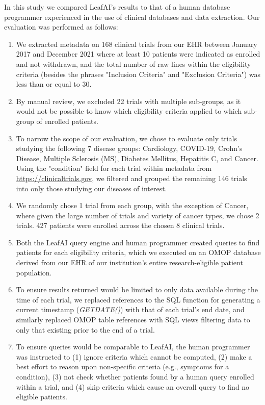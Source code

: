 \documentclass[../main.tex]{subfiles}
\begin{document}
In this study we compared LeafAI's results to that of a human database programmer experienced in the use of clinical databases and data extraction. Our evaluation was performed as follows:

\begin{enumerate}
    \item We extracted metadata on 168 clinical trials from our EHR between January 2017 and December 2021 where at least 10 patients were indicated as enrolled and not withdrawn, and the total number of raw lines within the eligibility criteria (besides the phrases "Inclusion Criteria" and "Exclusion Criteria") was less than or equal to 30.
    \item By manual review, we excluded 22 trials with multiple sub-groups, as it would not be possible to know which eligibility criteria applied to which sub-group of enrolled patients.
    \item To narrow the scope of our evaluation, we chose to evaluate only trials studying the following 7 disease groups: Cardiology, COVID-19, Crohn's Disease, Multiple Sclerosis (MS), Diabetes Mellitus, Hepatitis C, and Cancer. Using the "condition" field for each trial within metadata from \url{https://clinicaltrials.gov}, we filtered and grouped the remaining 146 trials into only those studying our diseases of interest. 
    \item We randomly chose 1 trial from each group, with the exception of Cancer, where given the large number of trials and variety of cancer types, we chose 2 trials. 427 patients were enrolled across the chosen 8 clinical trials.
    \item Both the LeafAI query engine and human programmer created queries to find patients for each eligibility criteria, which we executed on an OMOP database derived from our EHR of our institution's entire research-eligible patient population. 
    \item To ensure results returned would be limited to only data available during the time of each trial, we replaced references to the SQL function for generating a current timestamp (\textit{GETDATE()}) with that of each trial's end date, and similarly replaced OMOP table references with SQL views filtering data to only that existing prior to the end of a trial.
    \item To ensure queries would be comparable to LeafAI, the human programmer was instructed to (1) ignore criteria which cannot be computed, (2) make a best effort to reason upon non-specific criteria (e.g., symptoms for a condition), (3) not check whether patients found by a human query enrolled within a trial, and (4) skip criteria which cause an overall query to find no eligible patients.
\end{enumerate}
\end{document}
